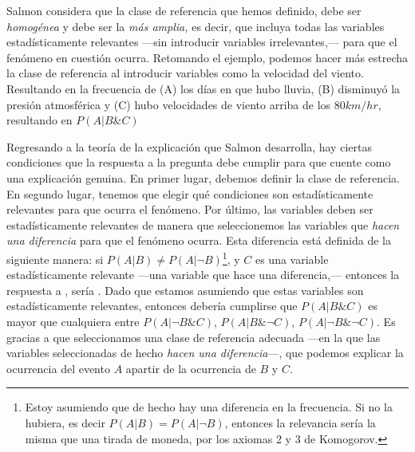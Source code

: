Salmon considera que la clase de referencia que hemos definido, debe ser
\emph{homogénea} y debe ser la \emph{más amplia,} es decir, que incluya
todas las variables estadísticamente relevantes ---sin introducir
variables irrelevantes,--- para que el fenómeno en cuestión ocurra.
Retomando el ejemplo, podemos hacer más estrecha la clase de
referencia al introducir variables como la velocidad del viento.
Resultando en la frecuencia de (A) los días en que hubo lluvia, (B)
disminuyó la presión atmosférica y (C) hubo velocidades de viento
arriba de los $ 80 km/hr $, resultando en $ P( A | B \& C ) $

Regresando a la teoría de la explicación que Salmon desarrolla, hay ciertas
condiciones que la respuesta a la pregunta  debe cumplir para que cuente como una explicación genuina. En
primer lugar, debemos definir la clase de referencia. En segundo
lugar, tenemos que elegir qué condiciones son estadísticamente
relevantes para que ocurra el fenómeno. Por último, las variables
deben ser estadísticamente relevantes de manera que seleccionemos las
variables que \emph{hacen una diferencia} para que el fenómeno
ocurra. Esta diferencia está definida de la siguiente manera: si
$ P( A | B ) \neq P( A | \neg{ B } ) $\footnote{
	Estoy asumiendo que de hecho hay una diferencia en la frecuencia. Si no
	la hubiera, es decir $ P( A | B ) = P( A | \neg{ B } ) $, entonces la
	relevancia sería la misma que una tirada	de moneda, por los axiomas 2 y
	3 de Komogorov.
}, y $C$ es una variable estadísticamente relevante ---una variable que
hace una diferencia,--- entonces la respuesta a , sería . Dado que estamos asumiendo que estas
variables son estadísticamente relevantes, entonces debería cumplirse
que $ P( A | B \& C )$ es mayor que cualquiera entre $ P( A | \neg{ B } \&
	C ) $, $ P( A | B \& \neg{ C } ) $, $ P( A | \neg{ B } \& \neg{ C } ) $.
Es gracias a que seleccionamos una clase de referencia adecuada ---en la
que las variables seleccionadas de hecho \emph {hacen una diferencia}---,
que podemos explicar la ocurrencia del evento $A$ apartir de la
ocurrencia de $B$ y $C$.

